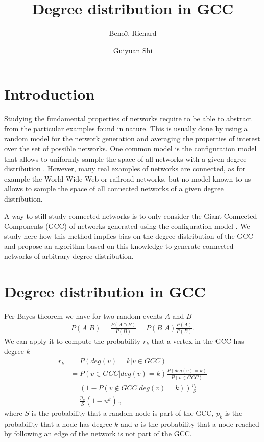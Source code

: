 \documentclass[a4paper, draft]{article}
\title{Degree distribution in GCC}
\author{Benoît Richard \and Guiyuan Shi}
\begin{document}
\listoftodos

\maketitle


\section{Introduction}

Studying the fundamental properties of networks require to be able to abstract from the particular examples found in nature. This is usually done \missingref by using a random model for the network generation and averaging the properties of interest over the set of possible networks. One common model is the configuration model \missingref that allows to uniformly sample the space of all networks with a given degree distribution \missingref. However, many real examples of networks are connected, as for example the World Wide Web or railroad networks, but no model known to us allows to sample the space of all connected networks of a given degree distribution.

A way to still study connected networks is to only consider the Giant Connected Components (GCC) of networks generated using the configuration model \missingref. We study here how this method implies bias on the degree distribution of the GCC and propose an algorithm based on this knowledge to generate connected networks of arbitrary degree distribution.

\section{Degree distribution in GCC}

Per Bayes theorem we have for two random events $A$ and $B$
\begin{align}
	P(A | B) = \frac{P(A \cap B)}{ P(B)} = P(B | A) \frac{P(A)}{P(B)}. \label{Bayes theorem}
\end{align}
We can apply it to compute the probability $r_k$ that a vertex in the GCC has degree $k$
\begin{align}
	r_k &= P(deg(v) = k | v \in GCC)\\
	&= P(v \in GCC | deg(v) = k) \frac{P(deg(v) = k)}{P(v \in GCC)} \\
	&= (1 - P(v \notin GCC|deg(v) = k)) \frac{p_k}{S} \\
	&= \frac{p_k}{S} (1 - u^k). \label{Degree distribution in GCC},
\end{align}
where $S$ is the probability that a random node is part of the GCC, $p_k$ is the probability that a node has degree $k$ and $u$ is the probability that a node reached by following an edge of the network is not part of the GCC. 
\end{document}
